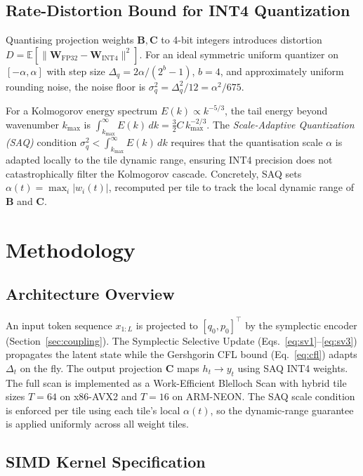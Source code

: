 \documentclass[10pt,twocolumn]{article}
\begin{document}
\subsection{Rate-Distortion Bound for INT4 Quantization}
\label{sec:rd}

Quantising projection weights $\mathbf{B},\mathbf{C}$ to 4-bit integers
introduces distortion $D = \mathbb{E}[\|\mathbf{W}_{\text{FP32}} -
\mathbf{W}_{\text{INT4}}\|^2]$.
For an ideal symmetric uniform quantizer on $[-\alpha,\alpha]$ with
step size $\Delta_q = 2\alpha/(2^b-1)$, $b=4$, and approximately uniform
rounding noise, the noise floor is
$\sigma_q^2 = \Delta_q^2/12 = \alpha^2/675$.

For a Kolmogorov energy spectrum $E(k)\propto k^{-5/3}$, the tail
energy beyond wavenumber $k_{\max}$ is
$\int_{k_{\max}}^\infty E(k)\,dk = \tfrac{3}{2}C\,k_{\max}^{-2/3}$.
The \textit{Scale-Adaptive Quantization (SAQ)} condition
$\sigma_q^2 < \int_{k_{\max}}^\infty E(k)\,dk$
requires that the quantisation scale $\alpha$ is adapted locally to the
tile dynamic range, ensuring INT4 precision does not
catastrophically filter the Kolmogorov cascade.
Concretely, SAQ sets
$\alpha(t) = \max_i |w_i(t)|$, recomputed per tile to track
the local dynamic range of $\mathbf{B}$ and $\mathbf{C}$.

\section{Methodology}
\label{sec:method}

\subsection{Architecture Overview}
An input token sequence $x_{1:L}$ is projected to
$[q_0,p_0]^{\top}$ by the symplectic encoder (Section~\ref{sec:coupling}).
The Symplectic Selective Update (Eqs.~\eqref{eq:sv1}--\eqref{eq:sv3})
propagates the latent state while the Gershgorin CFL bound
(Eq.~\eqref{eq:cfl}) adapts $\Delta_t$ on the fly.
The output projection $\mathbf{C}$ maps $h_t\to y_t$ using
SAQ INT4 weights.
The full scan is implemented as a Work-Efficient Blelloch Scan
\cite{blelloch1990prefix} with hybrid tile sizes
$T=64$ on x86-AVX2 and $T=16$ on ARM-NEON.
The SAQ scale condition is enforced per tile using each tile's local
$\alpha(t)$, so the dynamic-range guarantee is applied uniformly across
all weight tiles.
\subsection{SIMD Kernel Specification}
\label{sec:simd}
\end{document}
